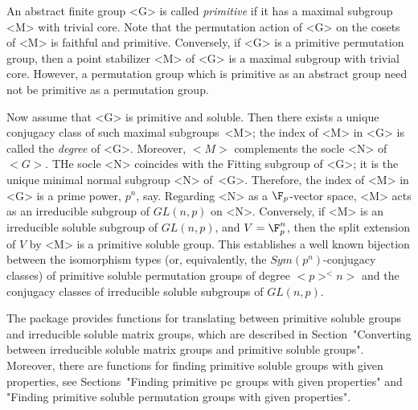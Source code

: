

An abstract finite group <G> is called {\it primitive} if it has a maximal 
subgroup <M> with trivial core. Note that the permutation action of <G> on the 
cosets of <M> is faithful and primitive. Conversely, if <G> is a primitive 
permutation group, then a point stabilizer <M> of <G> is a maximal
subgroup with trivial core. However, a permutation group which is primitive 
as an abstract group need not be primitive as a permutation group. 

Now assume that <G> is primitive and soluble. Then there exists a unique conjugacy class of 
such maximal subgroups~<M>; the index of <M> in <G> is called the {\it degree} of <G>.
Moreover, $<M>$ 
complements the socle <N> of $<G>$. THe socle <N> coincides with the Fitting 
subgroup of <G>; it is the unique minimal normal subgroup <N> of~<G>. Therefore, 
the index of <M> in <G> is a prime power, $p^n$, say.
Regarding <N> as a $\F_p$-vector space, <M> acts as an irreducible subgroup of $GL(n,p)$ on <N>.
Conversely, if <M> is an irreducible soluble subgroup of $GL(n,p)$, and $V = \F_p^n$, then the
split extension of $V$ by <M> is a primitive soluble group. 
This establishes a well known
bijection between the isomorphism types (or, equivalently, the 
$Sym(p^n)$-conjugacy classes) of primitive soluble permutation groups of degree
$<p>^<n>$ and the conjugacy classes of irreducible soluble subgroups of $GL(n, p)$.

The {\IRREDSOL} package provides functions for translating between primitive soluble 
groups and irreducible soluble matrix groups, which are
described in Section~"Converting between irreducible soluble matrix groups 
and primitive soluble groups". Moreover, there are functions for finding
primitive soluble groups with given properties, see Sections~"Finding primitive 
pc groups
with given properties" and "Finding primitive soluble permutation groups
with given properties".

\null

